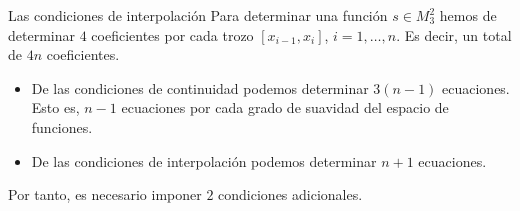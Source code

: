 \begin{frame}{Las condiciones de interpolación}
    Para determinar una función $s \in M_3^2$ hemos de determinar $4$
    coeficientes por cada trozo $[x_{i-1}, x_i]$, $i = 1, \dots, n$. Es
    decir, un total de $4n$ coeficientes.

    \begin{itemize}
        \item De las condiciones de continuidad podemos determinar $3(n-1)$
        ecuaciones. Esto es, $n - 1$ ecuaciones por cada grado de suavidad
        del espacio de funciones.
        \item De las condiciones de interpolación podemos determinar $n + 1
        $ ecuaciones.
    \end{itemize}

    Por tanto, es necesario imponer \alert{$2$ condiciones adicionales}.
\end{frame}
